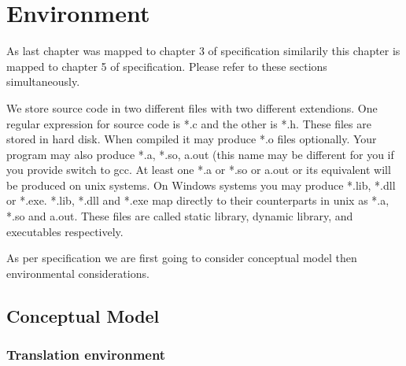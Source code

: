 \chapter{Environment}
\startcolumns[n=3,distance=2em]
  \placelist
    [section]
    [alternative=c, %
     interaction=all,]
\stopcolumns
As last chapter was mapped to chapter 3 of specification similarily
this chapter is mapped to chapter 5 of specification. Please refer to
these sections simultaneously.

We store source code in two different files with two different
extendions. One regular expression for source code is *.c and the
other is *.h. These files are stored in hard disk. When compiled it
may produce *.o files optionally. Your program may also produce *.a,
*.so, a.out (this name may be different for you if you provide
 switch to gcc. At least one *.a or *.so or a.out or its
equivalent will be produced on unix systems. On Windows systems you
may produce *.lib, *.dll or *.exe. *.lib, *.dll and *.exe map directly
to their counterparts in unix as *.a, *.so and a.out. These files are
called static library, dynamic library, and executables respectively.

As per specification we are first going to consider conceptual model
then environmental considerations.

\section{Conceptual Model}
\subsection{Translation environment}
